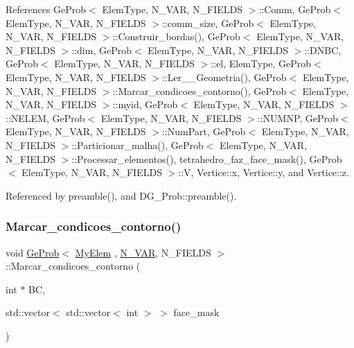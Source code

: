 References Ge\+Prob$<$ Elem\+Type, N\+\_\+\+V\+A\+R, N\+\_\+\+F\+I\+E\+L\+D\+S $>$\+::\+Comm, Ge\+Prob$<$ Elem\+Type, N\+\_\+\+V\+A\+R, N\+\_\+\+F\+I\+E\+L\+D\+S $>$\+::comm\+\_\+size, Ge\+Prob$<$ Elem\+Type, N\+\_\+\+V\+A\+R, N\+\_\+\+F\+I\+E\+L\+D\+S $>$\+::\+Construir\+\_\+bordas(), Ge\+Prob$<$ Elem\+Type, N\+\_\+\+V\+A\+R, N\+\_\+\+F\+I\+E\+L\+D\+S $>$\+::dim, Ge\+Prob$<$ Elem\+Type, N\+\_\+\+V\+A\+R, N\+\_\+\+F\+I\+E\+L\+D\+S $>$\+::\+D\+N\+BC, Ge\+Prob$<$ Elem\+Type, N\+\_\+\+V\+A\+R, N\+\_\+\+F\+I\+E\+L\+D\+S $>$\+::el, Elem\+Type, Ge\+Prob$<$ Elem\+Type, N\+\_\+\+V\+A\+R, N\+\_\+\+F\+I\+E\+L\+D\+S $>$\+::\+Ler\+\_\+\+\_\+\+Geometria(), Ge\+Prob$<$ Elem\+Type, N\+\_\+\+V\+A\+R, N\+\_\+\+F\+I\+E\+L\+D\+S $>$\+::\+Marcar\+\_\+condicoes\+\_\+contorno(), Ge\+Prob$<$ Elem\+Type, N\+\_\+\+V\+A\+R, N\+\_\+\+F\+I\+E\+L\+D\+S $>$\+::myid, Ge\+Prob$<$ Elem\+Type, N\+\_\+\+V\+A\+R, N\+\_\+\+F\+I\+E\+L\+D\+S $>$\+::\+N\+E\+L\+EM, Ge\+Prob$<$ Elem\+Type, N\+\_\+\+V\+A\+R, N\+\_\+\+F\+I\+E\+L\+D\+S $>$\+::\+N\+U\+M\+NP, Ge\+Prob$<$ Elem\+Type, N\+\_\+\+V\+A\+R, N\+\_\+\+F\+I\+E\+L\+D\+S $>$\+::\+Num\+Part, Ge\+Prob$<$ Elem\+Type, N\+\_\+\+V\+A\+R, N\+\_\+\+F\+I\+E\+L\+D\+S $>$\+::\+Particionar\+\_\+malha(), Ge\+Prob$<$ Elem\+Type, N\+\_\+\+V\+A\+R, N\+\_\+\+F\+I\+E\+L\+D\+S $>$\+::\+Processar\+\_\+elementos(), tetrahedro\+\_\+faz\+\_\+face\+\_\+mask(), Ge\+Prob$<$ Elem\+Type, N\+\_\+\+V\+A\+R, N\+\_\+\+F\+I\+E\+L\+D\+S $>$\+::V, Vertice\+::x, Vertice\+::y, and Vertice\+::z.



Referenced by preamble(), and D\+G\+\_\+\+Prob\+::preamble().

\mbox{\label{classGeProb_a6fc2ba08f7556408bd9082ed34ada7bd}} 
\subsubsection{\texorpdfstring{Marcar\+\_\+condicoes\+\_\+contorno()}{Marcar\_condicoes\_contorno()}}
{\footnotesize\ttfamily void \hyperlink{classGeProb}{Ge\+Prob}$<$ \hyperlink{DG__Prob_8h_a83cd887ced9a6587428f267e50cd4787}{My\+Elem} , \hyperlink{classED__Prob_a4e7d2ff1a8e435e336fb00c527224b5a}{N\+\_\+\+V\+AR}, N\+\_\+\+F\+I\+E\+L\+DS $>$\+::Marcar\+\_\+condicoes\+\_\+contorno (\begin{DoxyParamCaption}\item[{int $\ast$}]{BC,  }\item[{std\+::vector$<$ std\+::vector$<$ int $>$ $>$}]{face\+\_\+mask }\end{DoxyParamCaption})\hspace{0.3cm}{\ttfamily [inherited]}}



